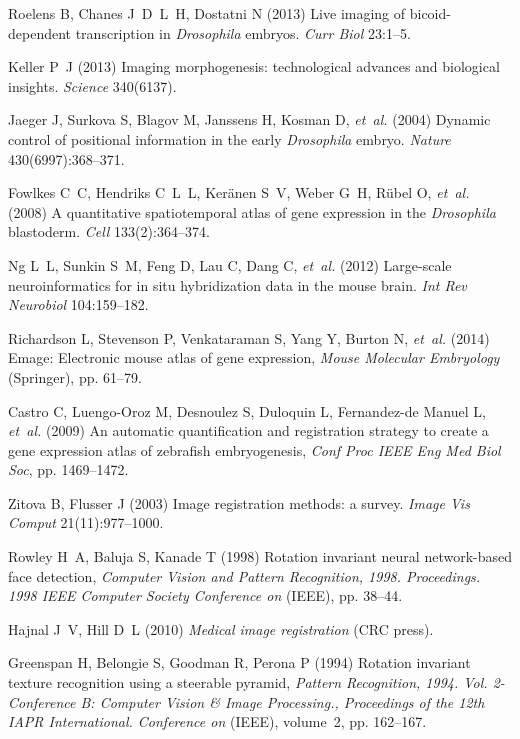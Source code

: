 \documentclass{pnastwo}
\begin{document}
\begin{article}
\begin{thebibliography}{10}
Roelens B, Chanes J~D~L~H, Dostatni N (2013) Live imaging of bicoid-dependent
  transcription in \textit{{D}rosophila} embryos. \textit{Curr Biol}
  23:1--5.

Keller P~J (2013) Imaging morphogenesis: technological advances and biological
  insights. \textit{Science} 340(6137).

Jaeger J, Surkova S, Blagov M, Janssens H, Kosman D, \textit{et~al.} (2004)
  Dynamic control of positional information in the early \textit{{D}rosophila}
  embryo. \textit{Nature} 430(6997):368--371.

Fowlkes C~C, Hendriks C~L~L, Ker{\"a}nen S~V, Weber G~H, R{\"u}bel O,
  \textit{et~al.} (2008) A quantitative spatiotemporal atlas of gene expression
  in the \textit{{D}rosophila} blastoderm. \textit{Cell} 133(2):364--374.

Ng L~L, Sunkin S~M, Feng D, Lau C, Dang C, \textit{et~al.} (2012) Large-scale
  neuroinformatics for in situ hybridization data in the mouse brain.
  \textit{Int Rev Neurobiol} 104:159--182.

Richardson L, Stevenson P, Venkataraman S, Yang Y, Burton N, \textit{et~al.}
  (2014) Emage: Electronic mouse atlas of gene expression, \textit{Mouse
  Molecular Embryology} (Springer), pp. 61--79.

Castro C, Luengo-Oroz M, Desnoulez S, Duloquin L, Fernandez-de Manuel L,
  \textit{et~al.} (2009) An automatic quantification and registration strategy
  to create a gene expression atlas of zebrafish embryogenesis,
  \textit{Conf Proc IEEE Eng Med Biol Soc}, pp. 1469--1472.

Zitova B, Flusser J (2003) Image registration methods: a survey. \textit{Image Vis Comput} 21(11):977--1000.

Rowley H~A, Baluja S, Kanade T (1998) Rotation invariant neural network-based
  face detection, \textit{Computer Vision and Pattern Recognition, 1998.
  Proceedings. 1998 IEEE Computer Society Conference on} (IEEE), pp. 38--44.

Hajnal J~V, Hill D~L (2010) \textit{Medical image registration} (CRC press).

Greenspan H, Belongie S, Goodman R, Perona P (1994) Rotation invariant texture
  recognition using a steerable pyramid, \textit{Pattern Recognition, 1994.
  Vol. 2-Conference B: Computer Vision \& Image Processing., Proceedings of the
  12th IAPR International. Conference on} (IEEE), volume~2, pp. 162--167.


\end{thebibliography}
\end{article}
\end{document}
